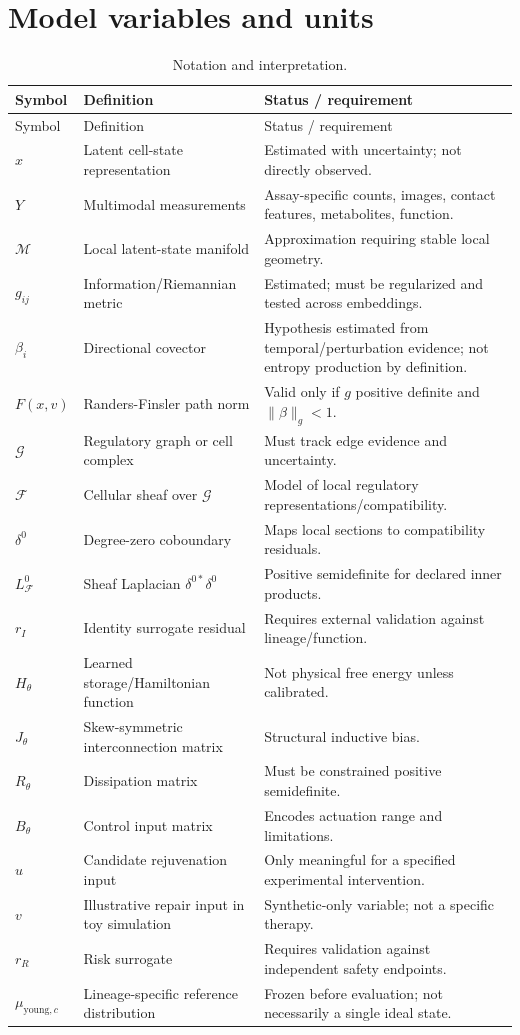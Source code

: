 \documentclass[11pt,a4paper]{article}
\theoremstyle{definition}
\theoremstyle{remark}
\newcommand{\M}{\mathcal{M}}
\newcommand{\G}{\mathcal{G}}
\newcommand{\Fsh}{\mathcal{F}}
\begin{document}
\section{Model variables and units}
\begin{longtable}{p{}p{}p{}}
\caption{Notation and interpretation.}\label{tab:notation}\\
\toprule Symbol & Definition & Status / requirement \\
\midrule
\endfirsthead
\toprule Symbol & Definition & Status / requirement \\
\midrule
\endhead
$x$ & Latent cell-state representation & Estimated with uncertainty; not directly observed. \\
$Y$ & Multimodal measurements & Assay-specific counts, images, contact features, metabolites, function. \\
$\M$ & Local latent-state manifold & Approximation requiring stable local geometry. \\
$g_{ij}$ & Information/Riemannian metric & Estimated; must be regularized and tested across embeddings. \\
$\beta_i$ & Directional covector & Hypothesis estimated from temporal/perturbation evidence; not entropy production by definition. \\
$F(x,v)$ & Randers-Finsler path norm & Valid only if $g$ positive definite and $\|\beta\|_g<1$. \\
$\G$ & Regulatory graph or cell complex & Must track edge evidence and uncertainty. \\
$\Fsh$ & Cellular sheaf over $\G$ & Model of local regulatory representations/compatibility. \\
$\delta^0$ & Degree-zero coboundary & Maps local sections to compatibility residuals. \\
$L_{\Fsh}^0$ & Sheaf Laplacian $\delta^{0*}\delta^0$ & Positive semidefinite for declared inner products. \\
$r_I$ & Identity surrogate residual & Requires external validation against lineage/function. \\
$H_\theta$ & Learned storage/Hamiltonian function & Not physical free energy unless calibrated. \\
$J_\theta$ & Skew-symmetric interconnection matrix & Structural inductive bias. \\
$R_\theta$ & Dissipation matrix & Must be constrained positive semidefinite. \\
$B_\theta$ & Control input matrix & Encodes actuation range and limitations. \\
$u$ & Candidate rejuvenation input & Only meaningful for a specified experimental intervention. \\
$v$ & Illustrative repair input in toy simulation & Synthetic-only variable; not a specific therapy. \\
$r_R$ & Risk surrogate & Requires validation against independent safety endpoints. \\
$\mu_{\mathrm{young},c}$ & Lineage-specific reference distribution & Frozen before evaluation; not necessarily a single ideal state. \\
\bottomrule
\end{longtable}
\end{document}
